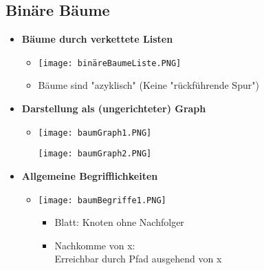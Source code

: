\subsection{Binäre Bäume}
    \begin{itemize}
        \item \textbf{Bäume durch verkettete Listen}
            \begin{itemize}
                \item[] \texttt{[image: binäreBaumeListe.PNG]}
                \item[] Bäume sind \string"azyklisch\string" (Keine "rückführende Spur")   
            \end{itemize}

        \item \textbf{Darstellung als (ungerichteter) Graph}
            \begin{itemize}
                \item[]
                    \begin{minipage}[t]{0.45\textwidth}
                        \texttt{[image: baumGraph1.PNG]}
                    \end{minipage}
                    \begin{minipage}[t]{0.45\textwidth}
                        \texttt{[image: baumGraph2.PNG]}
                    \end{minipage}
            \end{itemize}
        
            \item \textbf{Allgemeine Begrifflichkeiten}
                \begin{itemize}
                    \item[]
                        \begin{minipage}[t]{0.45\textwidth}
                            \texttt{[image: baumBegriffe1.PNG]}
                        \end{minipage}
                        \begin{minipage}[t]{0.45\textwidth}
                            \vspace{-3.5cm}
                            \begin{itemize}
                                \item Blatt: Knoten ohne Nachfolger
                                \item Nachkomme von x: \\
                                        Erreichbar durch Pfad ausgehend von x
                            \end{itemize}
                        \end{minipage}
                \end{itemize}


\end{itemize}
